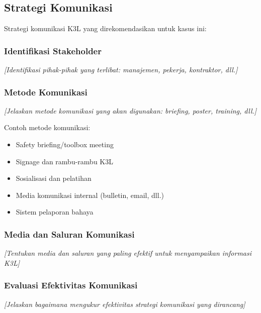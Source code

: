 \vspace{1cm}

\subsection{Strategi Komunikasi}
\label{subsec:strategi-komunikasi}


Strategi komunikasi K3L yang direkomendasikan untuk kasus ini:

\subsubsection{Identifikasi Stakeholder}
\textit{[Identifikasi pihak-pihak yang terlibat: manajemen, pekerja, kontraktor, dll.]}

\subsubsection{Metode Komunikasi}
\textit{[Jelaskan metode komunikasi yang akan digunakan: briefing, poster, training, dll.]}

Contoh metode komunikasi:
\begin{itemize}
    \item Safety briefing/toolbox meeting
    \item Signage dan rambu-rambu K3L
    \item Sosialisasi dan pelatihan
    \item Media komunikasi internal (bulletin, email, dll.)
    \item Sistem pelaporan bahaya
\end{itemize}

\subsubsection{Media dan Saluran Komunikasi}
\textit{[Tentukan media dan saluran yang paling efektif untuk menyampaikan informasi K3L]}

\subsubsection{Evaluasi Efektivitas Komunikasi}
\textit{[Jelaskan bagaimana mengukur efektivitas strategi komunikasi yang dirancang]}

